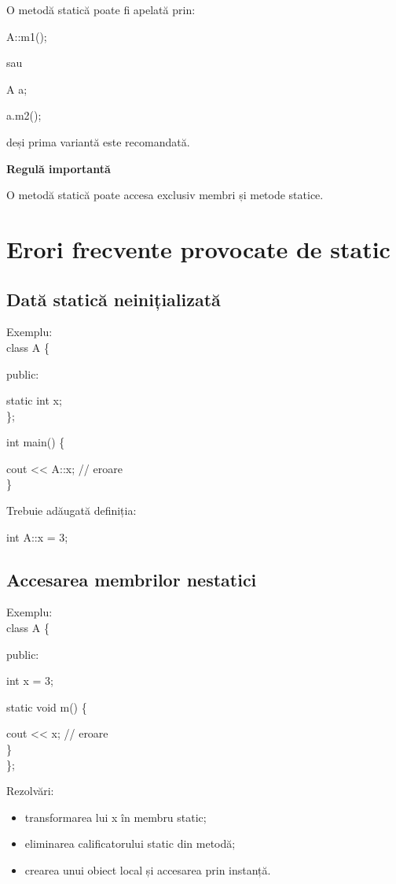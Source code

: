\documentclass[12pt,a4paper]{article}
\begin{document}
O metodă statică poate fi apelată prin:

A::m1();

sau

A a;

a.m2();

deși prima variantă este recomandată.

\textbf{Regulă importantă}

O metodă statică poate accesa exclusiv membri și metode statice.

\section{Erori frecvente provocate de static}

\subsection{Dată statică neinițializată}

Exemplu:
\\
class A \{

public:

    static int x;\\
\};

int main() \{

    cout << A::x; // eroare\\
\}

Trebuie adăugată definiția:

int A::x = 3;

\subsection{Accesarea membrilor nestatici}

Exemplu:
\\
class A \{

public:

    int x = 3;

    static void m() \{

        cout << x; // eroare\\
    \}\\
\};

Rezolvări:

\begin{itemize}
\item transformarea lui x în membru static;
\item eliminarea calificatorului static din metodă;
\item crearea unui obiect local și accesarea prin instanță.
\end{itemize}
\end{document}
